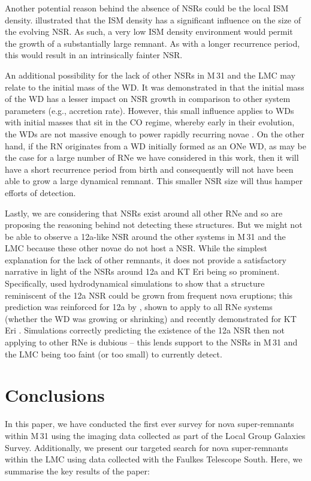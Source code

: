 \documentclass[fleqn,usenatbib]{mnras}
\begin{document}
Another potential reason behind the absence of NSRs could be the local ISM density. \citet{2023MNRAS.521.3004H} illustrated that the ISM density has a significant influence on the size of the evolving NSR. As such, a very low ISM density environment would permit the growth of a substantially large remnant. As with a longer recurrence period, this would result in an intrinsically fainter NSR.

An additional possibility for the lack of other NSRs in M\,31 and the LMC may relate to the initial mass of the WD. It was demonstrated in \citet{2023MNRAS.521.3004H} that the initial mass of the WD has a lesser impact on NSR growth in comparison to other system parameters (e.g., accretion rate). However, this small influence applies to WDs with initial masses that sit in the CO regime, whereby early in their evolution, the WDs are not massive enough to power rapidly recurring novae \citep[and so {\it are} able to grow a large dynamical NSR over many eruptions;][]{2023MNRAS.521.3004H}. On the other hand, if the RN originates from a WD initially formed as an ONe WD, as may be the case for a large number of RNe we have considered in this work, then it will have a short recurrence period from birth and consequently will not have been able to grow a large dynamical remnant. This smaller NSR size will thus hamper efforts of detection.

Lastly, we are considering that NSRs exist around all other RNe and so are proposing the reasoning behind not detecting these structures. But we might not be able to observe a 12a-like NSR around the other systems in M\,31 and the LMC because these other novae do not host a NSR. While the simplest explanation for the lack of other remnants, it does not provide a satisfactory narrative in light of the NSRs around 12a and KT Eri being so prominent. Specifically, \citet{2019Natur.565..460D} used hydrodynamical simulations to show that a structure reminiscent of the 12a NSR could be grown from frequent nova eruptions; this prediction was reinforced for 12a by \citet{2023MNRAS.521.3004H}, shown to apply to all RNe systems (whether the WD was growing or shrinking) and recently demonstrated for KT Eri \citep{2023arXiv231017258H}. Simulations correctly predicting the existence of the 12a NSR then not applying to other RNe is dubious -- this lends support to the NSRs in M\,31 and the LMC being too faint (or too small) to currently detect.

\section{Conclusions}\label{sec:Conclusions}
In this paper, we have conducted the first ever survey for nova super-remnants within M\,31 using the imaging data collected as part of the Local Group Galaxies Survey. Additionally, we present our targeted search for nova super-remnants within the LMC using data collected with the Faulkes Telescope South. Here, we summarise the key results of the paper:
\end{document}
